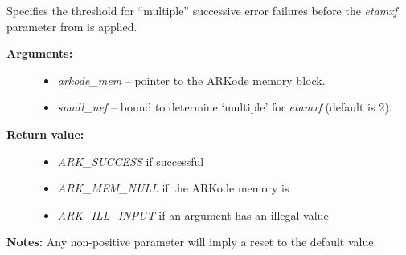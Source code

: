 \documentclass[letterpaper,10pt,english]{sphinxmanual}
\begin{document}
\begin{fulllineitems}
\label{c_interface/User_callable:ARKodeSetSmallNumEFails}
Specifies the threshold for ``multiple'' successive error failures
before the \emph{etamxf} parameter from
{\hyperref[c_interface/User_callable:ARKodeSetMaxEFailGrowth]{}} is applied.
\begin{description}
\item[{\textbf{Arguments:}}] \leavevmode\begin{itemize}
\item {} 
\emph{arkode\_mem} -- pointer to the ARKode memory block.

\item {} 
\emph{small\_nef} -- bound to determine `multiple' for \emph{etamxf} (default is 2).

\end{itemize}

\item[{\textbf{Return value:}}] \leavevmode\begin{itemize}
\item {} 
\emph{ARK\_SUCCESS} if successful

\item {} 
\emph{ARK\_MEM\_NULL} if the ARKode memory is 

\item {} 
\emph{ARK\_ILL\_INPUT} if an argument has an illegal value

\end{itemize}

\end{description}

\textbf{Notes:} Any non-positive parameter will imply a reset to the default value.

\end{fulllineitems}

\end{document}
